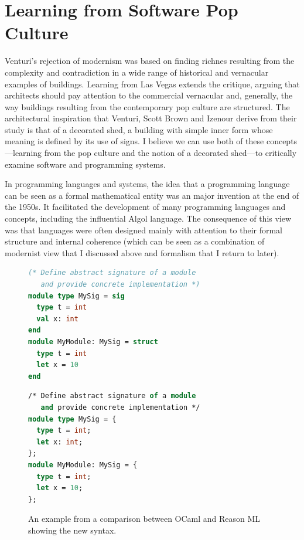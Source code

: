 \section{Learning from Software Pop Culture}

Venturi's rejection of modernism was based on finding richnes resulting from the complexity and
contradiction in a wide range of historical and vernacular examples of buildings. Learning from Las
Vegas extends the critique, arguing that architects should pay attention to the commercial
vernacular and, generally, the way buildings resulting from the contemporary pop culture are
structured. The architectural inspiration that Venturi, Scott Brown and Izenour derive from their
study is that of a decorated shed, a building with simple inner form whose meaning is defined by its
use of signs. I believe we can use both of these concepts---learning from the pop culture and
the notion of a decorated shed---to critically examine software and programming systems.

In programming languages and systems, the idea that a programming language can be seen as a
formal mathematical entity was an major invention at the end of the 1950s. It
facilitated the development of many programming languages and concepts, including the influential
Algol language. The consequence of this view was that languages were often designed mainly
with attention to their formal structure and internal coherence (which can be seen as
a combination of modernist view that I discussed above and formalism that I return to later).

\begin{figure}[t]
\begin{minipage}[t]{.5\textwidth}%
\begin{lstlisting}[language=ocaml]
(* Define abstract signature of a module
   and provide concrete implementation *)
module type MySig = sig
  type t = int
  val x: int
end
module MyModule: MySig = struct
  type t = int
  let x = 10
end
\end{lstlisting}
\end{minipage}
\begin{minipage}[t]{.5\textwidth}%
\begin{lstlisting}[language=ocaml]
/* Define abstract signature of a module
   and provide concrete implementation */
module type MySig = {
  type t = int;
  let x: int;
};
module MyModule: MySig = {
  type t = int;
  let x = 10;
};
\end{lstlisting}
\end{minipage}
\caption{An example from a comparison between OCaml and Reason ML showing the new syntax.}
\label{fig:reason}
\end{figure}

